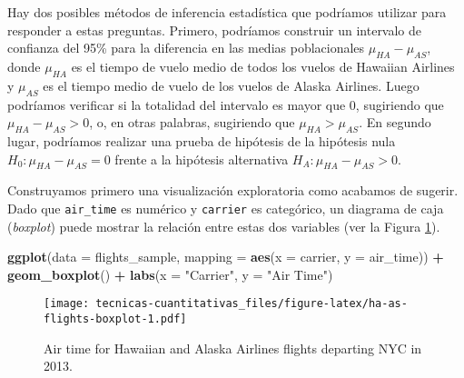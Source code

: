 \documentclass[
]{book}
\newenvironment{Shaded}{\begin{snugshade}}{\end{snugshade}}
\newcommand{\DataTypeTok}[1]{\textcolor[rgb]{0.13,0.29,0.53}{#1}}
\newcommand{\KeywordTok}[1]{\textcolor[rgb]{0.13,0.29,0.53}{\textbf{#1}}}
\newcommand{\NormalTok}[1]{#1}
\newcommand{\OperatorTok}[1]{\textcolor[rgb]{0.81,0.36,0.00}{\textbf{#1}}}
\newcommand{\StringTok}[1]{\textcolor[rgb]{0.31,0.60,0.02}{#1}}
\begin{document}
\begin{Shaded}
\end{Shaded}

Hay dos posibles métodos de inferencia estadística que podríamos utilizar para responder a estas preguntas. Primero, podríamos construir un intervalo de confianza del 95\% para la diferencia en las medias poblacionales \(\mu_{HA}-\mu_{AS}\), donde \(\mu_{HA}\) es el tiempo de vuelo medio de todos los vuelos de Hawaiian Airlines y \(\mu_{AS}\) es el tiempo medio de vuelo de los vuelos de Alaska Airlines. Luego podríamos verificar si la totalidad del intervalo es mayor que 0, sugiriendo que \(\mu_{HA} - \mu_{AS}> 0\), o, en otras palabras, sugiriendo que \(\mu_{HA}> \mu_{AS}\). En segundo lugar, podríamos realizar una prueba de hipótesis de la hipótesis nula \(H_0:\mu_{HA} - \mu_{AS} = 0\) frente a la hipótesis alternativa \(H_A:\mu_{HA}-\mu_{AS}>0\).

Construyamos primero una visualización exploratoria como acabamos de sugerir. Dado que \texttt{air\_time} es numérico y \texttt{carrier} es categórico, un diagrama de caja (\emph{boxplot}) puede mostrar la relación entre estas dos variables (ver la Figura \ref{fig:ha-as-flights-boxplot}).

\begin{Shaded}
\begin{Highlighting}[]
\KeywordTok{ggplot}\NormalTok{(}\DataTypeTok{data =}\NormalTok{ flights_sample, }\DataTypeTok{mapping =} \KeywordTok{aes}\NormalTok{(}\DataTypeTok{x =}\NormalTok{ carrier, }\DataTypeTok{y =}\NormalTok{ air_time)) }\OperatorTok{+}
\StringTok{  }\KeywordTok{geom_boxplot}\NormalTok{() }\OperatorTok{+}
\StringTok{  }\KeywordTok{labs}\NormalTok{(}\DataTypeTok{x =} \StringTok{"Carrier"}\NormalTok{, }\DataTypeTok{y =} \StringTok{"Air Time"}\NormalTok{)}
\end{Highlighting}
\end{Shaded}

\begin{figure}
\centering
\texttt{[image: tecnicas-cuantitativas\_files/figure-latex/ha-as-flights-boxplot-1.pdf]}
\caption{\label{fig:ha-as-flights-boxplot}Air time for Hawaiian and Alaska Airlines flights departing NYC in 2013.}
\end{figure}
\end{document}
